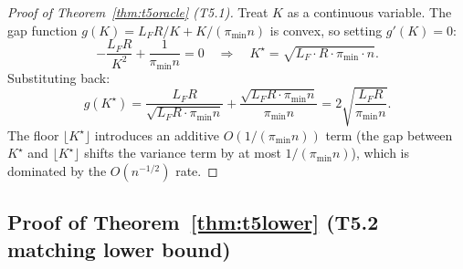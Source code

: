 \begin{proof}[Proof of Theorem~\ref{thm:t5oracle} (T5.1)]
Treat $K$ as a continuous variable. The gap function $g(K) = L_F R / K + K / (\pi_{\min} n)$ is convex, so setting $g'(K) = 0$:
\[
-\frac{L_F R}{K^2} + \frac{1}{\pi_{\min} n} = 0
\quad\Longrightarrow\quad
K^\star = \sqrt{L_F \cdot R \cdot \pi_{\min} \cdot n}.
\]
Substituting back:
\[
g(K^\star)
= \frac{L_F R}{\sqrt{L_F R \cdot \pi_{\min} n}} + \frac{\sqrt{L_F R \cdot \pi_{\min} n}}{\pi_{\min} n}
= 2\sqrt{\frac{L_F R}{\pi_{\min} n}}.
\]
The floor $\lfloor K^\star \rfloor$ introduces an additive $O(1/(\pi_{\min} n))$ term (the gap between $K^\star$ and $\lfloor K^\star \rfloor$ shifts the variance term by at most $1/(\pi_{\min} n)$), which is dominated by the $O(n^{-1/2})$ rate.
\end{proof}


\subsection{Proof of Theorem~\ref{thm:t5lower} (T5.2 matching lower bound)}
\label{app:proofs:t5lower}

